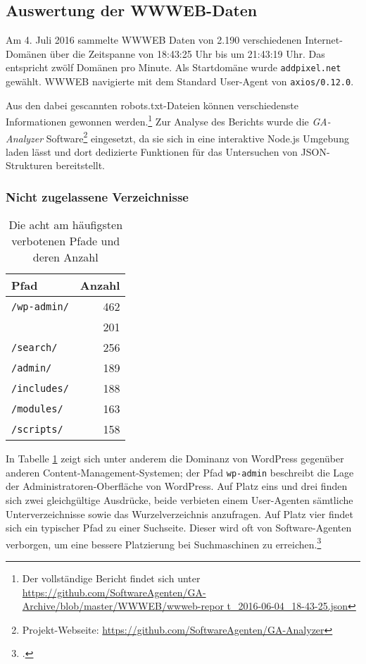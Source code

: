 \subsection{Auswertung der WWWEB-Daten}
\label{sub:auswertung-der-wwweb-daten}

Am 4. Juli 2016 sammelte WWWEB Daten von 2.190 verschiedenen Internet-Domänen
über die Zeitspanne von 18:43:25 Uhr bis um 21:43:19 Uhr. Das entspricht zwölf
Domänen pro Minute. Als Startdomäne wurde \texttt{addpixel.net} gewählt. WWWEB
navigierte mit dem Standard User-Agent von \texttt{axios/0.12.0}.

Aus den dabei gescannten robots.txt-Dateien können verschiedenste Informationen
gewonnen werden.\footnote{Der vollständige Bericht findet sich unter
\url{https://github.com/SoftwareAgenten/GA-Archive/blob/master/WWWEB/wwweb-repor
t_2016-06-04_18-43-25.json}} Zur Analyse des Berichts wurde die
\emph{GA-Analyzer} Software\footnote{Projekt-Webseite:
\url{https://github.com/SoftwareAgenten/GA-Analyzer}} eingesetzt, da sie sich
in eine interaktive Node.js Umgebung laden lässt und dort dedizierte Funktionen
für das Untersuchen von JSON-Strukturen bereitstellt.

\subsubsection{Nicht zugelassene Verzeichnisse}
\label{ssub:nicht-zugelassene-verzeichnisse}

\begin{table}[h]
  \begin{tabular}{ l|r }
    \textbf{Pfad} & \textbf{Anzahl}\\
    \hline
    \texttt{/wp-admin/} & 462 \\
                        & 201 \\
    \texttt{/search/}   & 256 \\
    \texttt{/admin/}    & 189 \\
    \texttt{/includes/} & 188 \\
    \texttt{/modules/}  & 163 \\
    \texttt{/scripts/}  & 158 \\
  \end{tabular}
  
  \caption{Die acht am häufigsten verbotenen Pfade und deren Anzahl}
  \label{tab:maxBlockedDirs}
\end{table}

In Tabelle \ref{tab:maxBlockedDirs} zeigt sich unter anderem die Dominanz von
WordPress gegenüber anderen Content-Management-Systemen; der Pfad
\texttt{wp-admin} beschreibt die Lage der Administratoren-Oberfläche von
WordPress. Auf Platz eins und drei finden sich zwei gleichgültige Ausdrücke,
beide verbieten einem User-Agenten sämtliche Unterverzeichnisse sowie das
Wurzelverzeichnis anzufragen. Auf Platz vier findet sich ein typischer Pfad zu
einer Suchseite. Dieser wird oft von Software-Agenten verborgen, um eine
bessere Platzierung bei Suchmaschinen zu erreichen.\footcite{siteSearchSEO}


